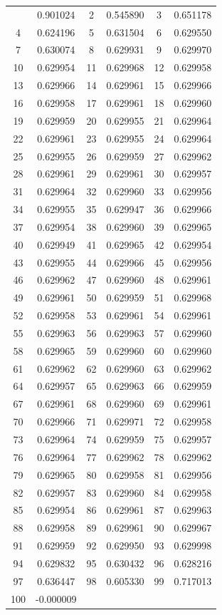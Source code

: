 \documentclass[12pt]{article}
\begin{document}
\begin{longtable}{@{}cc|cc|cc@{}}
\bottomrule
\endlastfoot
1 & 0.901024 & 2 & 0.545890 & 3 & 0.651178 \\
4 & 0.624196 & 5 & 0.631504 & 6 & 0.629550 \\
7 & 0.630074 & 8 & 0.629931 & 9 & 0.629970 \\
10 & 0.629954 & 11 & 0.629968 & 12 & 0.629958 \\
13 & 0.629966 & 14 & 0.629961 & 15 & 0.629966 \\
16 & 0.629958 & 17 & 0.629961 & 18 & 0.629960 \\
19 & 0.629959 & 20 & 0.629955 & 21 & 0.629964 \\
22 & 0.629961 & 23 & 0.629955 & 24 & 0.629964 \\
25 & 0.629955 & 26 & 0.629959 & 27 & 0.629962 \\
28 & 0.629961 & 29 & 0.629961 & 30 & 0.629957 \\
31 & 0.629964 & 32 & 0.629960 & 33 & 0.629956 \\
34 & 0.629955 & 35 & 0.629947 & 36 & 0.629966 \\
37 & 0.629954 & 38 & 0.629960 & 39 & 0.629965 \\
40 & 0.629949 & 41 & 0.629965 & 42 & 0.629954 \\
43 & 0.629955 & 44 & 0.629966 & 45 & 0.629956 \\
46 & 0.629962 & 47 & 0.629960 & 48 & 0.629961 \\
49 & 0.629961 & 50 & 0.629959 & 51 & 0.629968 \\
52 & 0.629958 & 53 & 0.629961 & 54 & 0.629961 \\
55 & 0.629963 & 56 & 0.629963 & 57 & 0.629960 \\
58 & 0.629965 & 59 & 0.629960 & 60 & 0.629960 \\
61 & 0.629962 & 62 & 0.629960 & 63 & 0.629962 \\
64 & 0.629957 & 65 & 0.629963 & 66 & 0.629959 \\
67 & 0.629961 & 68 & 0.629960 & 69 & 0.629961 \\
70 & 0.629966 & 71 & 0.629971 & 72 & 0.629958 \\
73 & 0.629964 & 74 & 0.629959 & 75 & 0.629957 \\
76 & 0.629964 & 77 & 0.629962 & 78 & 0.629962 \\
79 & 0.629965 & 80 & 0.629958 & 81 & 0.629956 \\
82 & 0.629957 & 83 & 0.629960 & 84 & 0.629958 \\
85 & 0.629954 & 86 & 0.629961 & 87 & 0.629963 \\
88 & 0.629958 & 89 & 0.629961 & 90 & 0.629967 \\
91 & 0.629959 & 92 & 0.629950 & 93 & 0.629998 \\
94 & 0.629832 & 95 & 0.630432 & 96 & 0.628216 \\
97 & 0.636447 & 98 & 0.605330 & 99 & 0.717013 \\
100 & -0.000009 &  &  &  &  \\

\end{longtable}
\end{document}
